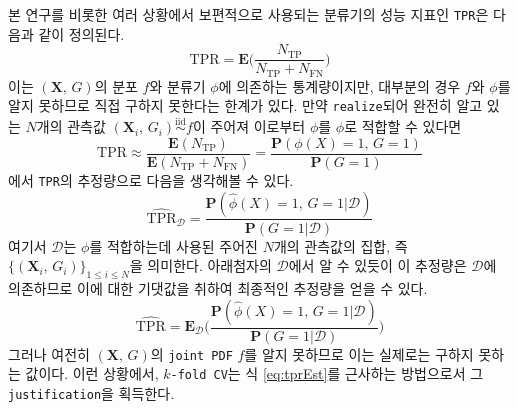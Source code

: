 \documentclass[10pt,onecolumn,twoside,a4size]{gsag3jnl}
\newcommand{\iid}{\stackrel{\mathrm{iid}}{\sim}}
\begin{document}
본 연구를 비롯한 여러 상황에서 보편적으로 사용되는 분류기의 성능 지표인 \texttt{TPR}은 다음과 같이 정의된다.
\begin{equation}
  \mathrm{TPR}=\mathbf{E}\bigg(\frac{N_\mathrm{TP}}{N_\mathrm{TP}+N_\mathrm{FN}}\bigg)
\end{equation}
이는 $(\mathbf{X},\,G)$의 분포 $f$와 분류기 $\phi$에 의존하는 통계량이지만, 대부분의 경우 $f$와 $\phi$를 알지 못하므로 직접 구하지 못한다는 한계가 있다. 만약 \texttt{realize}되어 완전히 알고 있는 $N$개의 관측값 $(\mathbf{X}_i,\,G_i)\iid f$이 주어져 이로부터 $\phi$를 $\widehat{\phi}$로 적합할 수 있다면
\begin{equation}
  \mathrm{TPR}\approx\frac{\mathbf{E}(N_\mathrm{TP})}{\mathbf{E}(N_\mathrm{TP}+N_\mathrm{FN})}=\frac{\mathbf{P}(\phi(X)=1,\,G=1)}{\mathbf{P}(G=1)}
\end{equation}
에서 \texttt{TPR}의 추정량으로 다음을 생각해볼 수 있다.
\begin{equation}
  \widehat{\mathrm{TPR}}_\mathcal{D}=\frac{\mathbf{P}(\widehat{\phi}(X)=1,\,G=1\vert\mathcal{D})}{\mathbf{P}(G=1\vert\mathcal{D})}
\end{equation}
여기서 $\mathcal{D}$는 $\phi$를 적합하는데 사용된 주어진 $N$개의 관측값의 집합, 즉 $\{(\mathbf{X}_i,\,G_i)\}_{1\leq i\leq N}$을 의미한다. 아래첨자의 $\mathcal{D}$에서 알 수 있듯이 이 추정량은 $\mathcal{D}$에 의존하므로 이에 대한 기댓값을 취하여 최종적인 추정량을 얻을 수 있다.
\begin{equation}\label{eq:tprEst}
  \widehat{\mathrm{TPR}}=\mathbf{E}_\mathcal{D}\bigg(\frac{\mathbf{P}(\widehat{\phi}(X)=1,\,G=1\vert\mathcal{D})}{\mathbf{P}(G=1\vert\mathcal{D})}\bigg)
\end{equation}
그러나 여전히 $(\mathbf{X},\,G)$의 \texttt{joint PDF} $f$를 알지 못하므로 이는 실제로는 구하지 못하는 값이다. 이런 상황에서, \texttt{$k$-fold CV}는 식 \ref{eq:tprEst}를 근사하는 방법으로서 그 \texttt{justification}을 획득한다.
\end{document}
